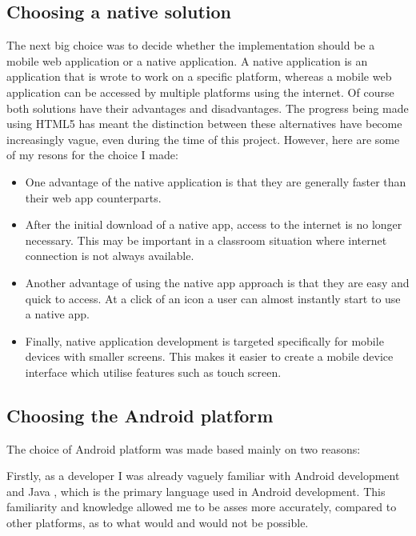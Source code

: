 \subsection{Choosing a native solution}

The next big choice was to decide whether the implementation should be a mobile web application or a native application. A native application is an application that is wrote to work on a specific platform, whereas a mobile web application can be accessed by multiple platforms using the internet. Of course both solutions have their advantages and disadvantages. The progress being made using HTML5 has meant the distinction between these alternatives have become increasingly vague, even during the time of this project. However, here are some of my resons for the choice I made: 
\begin{itemize}
\item{	
One advantage of the native application is that they are generally faster than their web app counterparts. }
\item{
After the initial download of a native app, access to the internet is no longer necessary. This may be important in a classroom situation where internet connection is not always available.}
\item{
Another advantage of using the native app approach is that they are easy and quick to access. At a click of an icon a user can almost instantly start to use a native app.}
\item{
Finally, native application development is targeted specifically for mobile devices with smaller screens. This makes it easier to create a mobile device interface which utilise features such as touch screen.}
\end{itemize}








\subsection{Choosing the Android platform}

The choice of Android platform was made based mainly on two reasons:

Firstly, as a developer I was already vaguely familiar with Android development and  Java , which is the primary language used in Android development. This familiarity and knowledge allowed me to be asses more accurately, compared to other platforms,  as to what would and would not be possible.

